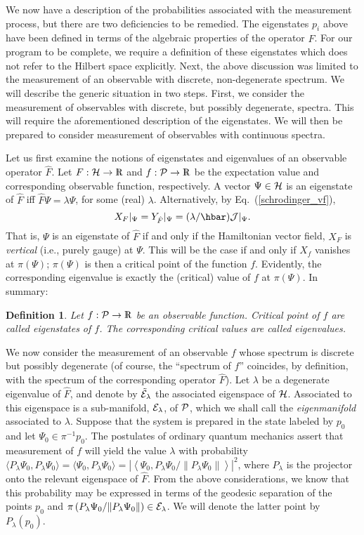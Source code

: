\documentclass[12pt,aps,eqsecnum,tighten]{revtex4-2}
\newtheorem{definition}{Definition}[section]
\def\be{\begin{equation}}
\def\ee{\end{equation}}
\def\<{\langle}
\def\>{\rangle}
\def\H{{\cal H}}
\def\P{{\cal P}}
\def\J{{\cal J}}
\newcommand{\eqn}[1]{Eq.~(\ref{#1})}
\newcommand{\hvf}[1]{{X_{#1}}}
\def\Bbb{}
\def\Rl{{\mathchoice 
{\setbox0=\hbox{$\displaystyle\rm R$}\hbox{\hbox to0pt
{\kern0.4\wd0\vrule height0.9\ht0\hss}\box0}}
{\setbox0=\hbox{$\textstyle\rm R$}\hbox{\hbox to0pt
{\kern0.4\wd0\vrule height0.9\ht0\hss}\box0}}
{\setbox0=\hbox{$\scriptstyle\rm R$}\hbox{\hbox to0pt
{\kern0.4\wd0\vrule height0.9\ht0\hss}\box0}}
{\setbox0=\hbox{$\scriptscriptstyle\rm R$}\hbox{\hbox to0pt
{\kern0.4\wd0\vrule height0.9\ht0\hss}\box0}}}}
\def\Rl{{\mathchoice
{\setbox0=\hbox{$\displaystyle\rm R$}\hbox{\hbox to0pt
{\kern0.4\wd0\vrule height0.9\ht0\hss}\box0}}
{\setbox0=\hbox{$\textstyle\rm R$}\hbox{\hbox to0pt
{\kern0.4\wd0\vrule height0.9\ht0\hss}\box0}}
{\setbox0=\hbox{$\scriptstyle\rm R$}\hbox{\hbox to0pt
{\kern0.4\wd0\vrule height0.9\ht0\hss}\box0}}
{\setbox0=\hbox{$\scriptscriptstyle\rm R$}\hbox{\hbox to0pt
{\kern0.4\wd0\vrule height0.9\ht0\hss}\box0}}}}
\def\R{\Rl}
\begin{document}
We now have a description of the probabilities associated with the
measurement process, but there are two deficiencies to be remedied.
The eigenstates $p_i$ above have been defined in terms of the
algebraic properties of the operator $\hat{F}$.  For our program to be
complete, we require a definition of these eigenstates which does not
refer to the Hilbert space explicitly.  Next, the above discussion was
limited to the measurement of an observable with discrete,
non-degenerate spectrum.  We will describe the generic situation in
two steps.  First, we consider the measurement of observables with
discrete, but possibly degenerate, spectra.  This will require the
aforementioned description of the eigenstates.  We will then be
prepared to consider measurement of observables with continuous
spectra.

Let us first examine the notions of eigenstates and eigenvalues of an
observable operator $\hat{F}$. Let $F : \H \rightarrow \R$ and $f :
\P \rightarrow \R$ be the expectation value and corresponding
observable function, respectively.  A vector $\Psi\in\H$ is an
eigenstate of $\hat{F}$ iff $\hat{F}\Psi = \lambda \Psi$, for some
(real) $\lambda$.  Alternatively, by \eqn{schrodinger_vf},
%
\be
\hvf{F}|_\Psi = Y_{\hat{F}}|_\Psi = (\lambda / \hbar) \J|_\Psi.
\ee
%
That is, $\Psi$ is an eigenstate of $\hat{F}$ if and only if the
Hamiltonian vector field, $\hvf{F}$ is {\em vertical} (i.e., purely
gauge) at $\Psi$.  This will be the case if and only if $\hvf{f}$
vanishes at $\pi(\Psi)$;  $\pi(\Psi)$ is then a critical point of the
function $f$.  Evidently, the corresponding eigenvalue is exactly the
(critical) value of $f$ at $\pi(\Psi)$.  In summary:
%
\begin{definition}
Let $f:\P\rightarrow\R$ be an observable function.  Critical point of
$f$ are called {\em eigenstates} of $f$.  The corresponding critical
values are called {\em eigenvalues}.
\end{definition}

We now consider the measurement of an observable $f$ whose spectrum is
discrete but possibly degenerate (of course, the ``spectrum of $f$''
coincides, by definition, with the spectrum of the corresponding
operator $\hat{F}$).  Let $\lambda$ be a degenerate eigenvalue of
$\hat{F}$, and denote by $\tilde{\cal E}_\lambda$ the associated
eigenspace of $\H$.  Associated to this eigenspace is a sub-manifold,
${\cal E}_\lambda$, of $\P$, which we shall call the {\em
eigenmanifold} associated to $\lambda$.  Suppose that the system is
prepared in the state labeled by $p_0$ and let $\Psi_0 \in
\pi^{-1}p_0$.  The postulates of ordinary quantum mechanics assert
that measurement of $f$ will yield the value $\lambda$ with
probability $\< {\Bbb P}_\lambda \Psi_0, {\Bbb P}_\lambda \Psi_0 \> =
\< \Psi_0, {\Bbb P}_\lambda \Psi_0 \> = \left| \left< \Psi_0, {\Bbb
P}_\lambda \Psi_0 / \| {\Bbb P}_\lambda \Psi_0 \| \right> \right|^2$,
where ${\Bbb P}_\lambda$ is the projector onto the relevant eigenspace
of $\hat{F}$. {}From the above considerations, we know that this
probability may be expressed in terms of the geodesic separation of
the points $p_0$ and $\pi\left( {\Bbb P}_\lambda \Psi_0 / \| {\Bbb
P}_\lambda \Psi_0 \|\right) \in {\cal E}_\lambda$.  We will denote the
latter point by ${\Bbb P}_\lambda(p_0)$.
\end{document}
